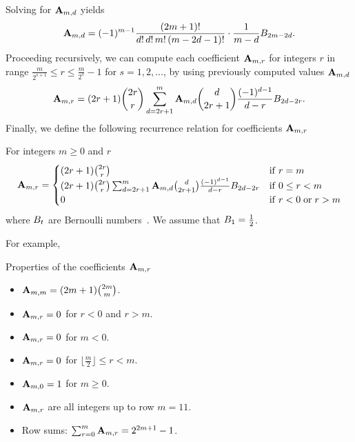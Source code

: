 Solving for ${\mathbf{A}} \sb{m,d}$ yields
\begin{equation*}
    {\mathbf{A}} \sb{m,d}
    = (-1)^{m-1} \frac{(2m+1)!}{d! \, d! \, m! \, (m - 2d - 1)!} \cdot \frac{1}{m - d} {B}\sb{2m - 2d}.
\end{equation*}
Proceeding recursively, we can compute each coefficient ${\mathbf{A}} \sb{m,r}$ for integers $r$ in range
$\frac{m}{2^{s+1}} \leq r \leq \frac{m}{2^s}-1$ for $s = 1, 2, \ldots$,
by using previously computed values ${\mathbf{A}} \sb{m,d}$
\begin{equation*}
    {\mathbf{A}} \sb{m,r} =
    (2r+1) \binom{2r}{r} \sum_{d = 2r+1}^{m}
    {\mathbf{A}} \sb{m,d} \binom{d}{2r+1} \frac{(-1)^{d-1}}{d - r} {B}\sb{2d - 2r}.
\end{equation*}
Finally, we define the following recurrence relation for coefficients ${\mathbf{A}} \sb{m,r}$
\begin{proposition}
    For integers $m\geq0$ and $r$
    \label{prop:coefficients_a}
    \begin{align*}
        {\mathbf{A}} \sb{m,r} =
        \begin{cases}
        (2r+1)
            \binom{2r}{r} & \mathrm{if} \; r=m \\
            (2r+1) \binom{2r}{r} \sum_{d = 2r+1}^{m} {\mathbf{A}} \sb{m,d} \binom{d}{2r+1} \frac{(-1)^{d-1}}{d-r}
            {B}\sb{2d-2r} & \mathrm{if} \; 0 \leq r<m \\
            0 & \mathrm{if} \; r<0 \; \mathrm{or} \; r>m
        \end{cases}
    \end{align*}
    where ${B}\sb{t}$ are Bernoulli numbers~\cite{weisstein2002bernoulli}.
    We assume that ${B}\sb{1}=\frac{1}{2}$.
\end{proposition}
For example,

Properties of the coefficients ${\mathbf{A}} \sb{m,r}$
\begin{itemize}
    \item ${\mathbf{A}} \sb{m,m} = (2m+1)\binom{2m}{m}$.
    \item ${\mathbf{A}} \sb{m,r} = 0$ for $r < 0$ and $r > m$.
    \item ${\mathbf{A}} \sb{m,r} = 0$ for $m < 0$.
    \item ${\mathbf{A}} \sb{m,r} = 0$ for $\lfloor \frac{m}{2} \rfloor \leq r < m$.
    \item ${\mathbf{A}} \sb{m,0} = 1$ for $m \geq 0$.
    \item ${\mathbf{A}} \sb{m,r}$ are all integers up to row $m = 11$.
    \item Row sums: $\sum_{r=0}^{m} {\mathbf{A}} \sb{m,r} = 2^{2m+1} - 1$.
\end{itemize}
